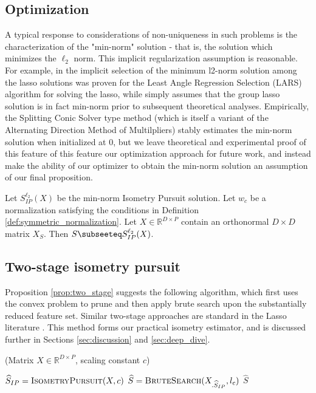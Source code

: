 \subsection{Optimization}

A typical response to considerations of non-uniqueness in such problems is the characterization of the "min-norm" solution - that is, the solution which minimizes the $\ell_2$ norm.
This implicit regularization assumption is reasonable.
For example, in \citet{Tibshirani2012-vw} the implicit selection of the minimum l2-norm solution among the lasso solutions was proven for the Least Angle Regression Selection (LARS) algorithm for solving the lasso, while \citet{Mishkin2022-yf} simply assumes that the group lasso solution is in fact min-norm prior to subsequent theoretical analyses.
Empirically, the Splitting Conic Solver type method (which is itself a variant of the Alternating Direction Method of Multilpliers) stably estimates the min-norm solution when initialized at $0$, but we leave theoretical and experimental proof of this feature of this feature our optimization approach for future work, and instead make the ability of our optimizer to obtain the min-norm solution an assumption of our final proposition.

\begin{proposition}
Let $S_{IP}^{\ell_2} (X)$ be the min-norm Isometry Pursuit solution.
Let $w_c$ be a normalization satisfying the conditions in Definition \ref{def:symmetric_normalization}.
Let $X \in \mathbb R^{D \times P}$ contain an orthonormal $D \times D$ matrix $X_S$.
Then $S \subseeteq S_{IP}^{\ell_2} (X)$.
\label{prop:two_stage}
\end{proposition}

\subsection{Two-stage isometry pursuit}

Proposition \ref{prop:two_stage} suggests the following algorithm, which first uses the convex problem to prune and then apply brute search upon the substantially reduced feature set.
Similar two-stage approaches are standard in the Lasso literature \cite{Hesterberg2008-iy, Koelle2022-ju}.
This method forms our practical isometry estimator, and is discussed further in Sections \ref{sec:discussion} and \ref{sec:deep_dive}.

\begin{algorithm}[H]
\caption{\tsip(Matrix ${X} \in \mathbb{R}^{D \times P}$, scaling constant $c$)}
\begin{algorithmic}[1]
\STATE $\widehat{S}_{IP} = \text{{\sc IsometryPursuit}}( X, c)$
\STATE $\widehat{S} = \text {{\sc BruteSearch}}({X}_{.\widehat{S}_{IP}}, l_c)$
 $\widehat{S}$
\end{algorithmic}
\end{algorithm}

